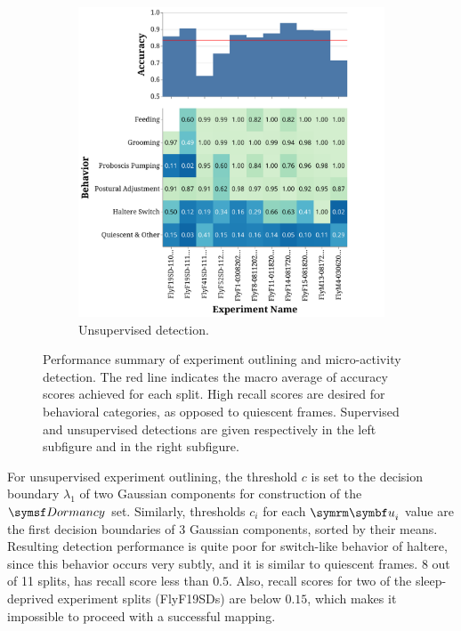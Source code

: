 \begin{figure}[thb!]
\begin{subfigure}[b]{0.495\linewidth}
		\centering\includegraphics[width=\linewidth]{figures/OutliningPerformance-Unsupervised.pdf}
		\caption{Unsupervised detection.}
	\end{subfigure}%
	\caption[Performance summary of experiment outlining and micro-activity detection.]{Performance summary of experiment outlining and micro-activity detection.
		The red line indicates the macro average of accuracy scores achieved for each split.
		High recall scores are desired for behavioral categories, as opposed to quiescent frames.
		Supervised and unsupervised detections are given respectively in the left subfigure and in the right subfigure. \label{figure:outlining-performance}}
\end{figure}

For unsupervised experiment outlining, the threshold $c$ is set to the decision boundary $\lambda_1$ of two Gaussian components for construction of the $\Dormancy$ set.
Similarly, thresholds $c_i$ for each $\V{u}_i$ value are the first decision boundaries of $3$ Gaussian components, sorted by their means.
Resulting detection performance is quite poor for switch-like behavior of haltere, since this behavior occurs very subtly, and it is similar to quiescent frames.
8 out of 11 splits, has recall score less than $0.5$.
Also, recall scores for two of the sleep-deprived experiment splits (FlyF19SDs) are below $0.15$, which makes it impossible to proceed with a successful mapping.

